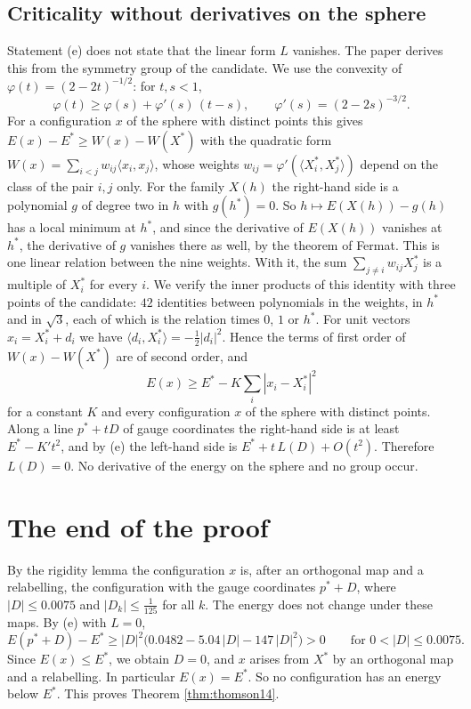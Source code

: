 \documentclass[reqno,a4paper,11pt]{amsart}
\begin{document}
\subsection*{Criticality without derivatives on the sphere}
Statement (e) does not state that the linear form $L$ vanishes. The paper derives this from the symmetry group of the candidate. We use the convexity of $\varphi(t) = (2 - 2t)^{-1/2}$: for $t, s < 1$,
\[
    \varphi(t) \geq \varphi(s) + \varphi'(s) \, (t - s) , \qquad \varphi'(s) = (2 - 2s)^{-3/2} .
\]
For a configuration $x$ of the sphere with distinct points this gives $E(x) - E^* \geq W(x) - W(X^*)$ with the quadratic form $W(x) = \sum_{i<j} w_{ij} \langle x_i, x_j \rangle$, whose weights $w_{ij} = \varphi'(\langle X^*_i, X^*_j \rangle)$ depend on the class of the pair $i, j$ only. For the family $X(h)$ the right-hand side is a polynomial $g$ of degree two in $h$ with $g(h^*) = 0$. So $h \mapsto E(X(h)) - g(h)$ has a local minimum at $h^*$, and since the derivative of $E(X(h))$ vanishes at $h^*$, the derivative of $g$ vanishes there as well, by the theorem of Fermat. This is one linear relation between the nine weights. With it, the sum $\sum_{j \neq i} w_{ij} X^*_j$ is a multiple of $X^*_i$ for every $i$. We verify the inner products of this identity with three points of the candidate: $42$ identities between polynomials in the weights, in $h^*$ and in $\sqrt 3$, each of which is the relation times $0$, $1$ or $h^*$. For unit vectors $x_i = X^*_i + d_i$ we have $\langle d_i, X^*_i \rangle = -\tfrac12 |d_i|^2$. Hence the terms of first order of $W(x) - W(X^*)$ are of second order, and
\[
    E(x) \geq E^* - K \sum_i |x_i - X^*_i|^2
\]
for a constant $K$ and every configuration $x$ of the sphere with distinct points. Along a line $p^* + t D$ of gauge coordinates the right-hand side is at least $E^* - K' t^2$, and by (e) the left-hand side is $E^* + t \, L(D) + O(t^2)$. Therefore $L(D) = 0$. No derivative of the energy on the sphere and no group occur.

\section{The end of the proof}

By the rigidity lemma the configuration $x$ is, after an orthogonal map and a relabelling, the configuration with the gauge coordinates $p^* + D$, where $|D| \leq 0.0075$ and $|D_k| \leq \frac{1}{125}$ for all $k$. The energy does not change under these maps. By (e) with $L = 0$,
\[
    E(p^* + D) - E^* \geq |D|^2 \bigl( 0.0482 - 5.04 \, |D| - 147 \, |D|^2 \bigr) > 0 \qquad \text{for } 0 < |D| \leq 0.0075 .
\]
Since $E(x) \leq E^*$, we obtain $D = 0$, and $x$ arises from $X^*$ by an orthogonal map and a relabelling. In particular $E(x) = E^*$. So no configuration has an energy below $E^*$. This proves Theorem \ref{thm:thomson14}.
\end{document}
